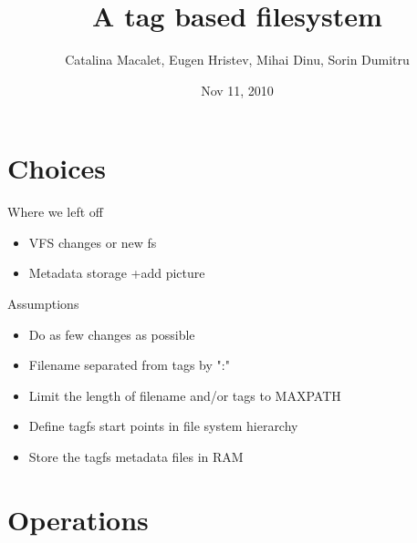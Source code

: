 \documentclass{beamer}
\title[TagFS]{A tag based filesystem}
\author{Catalina Macalet, Eugen Hristev, Mihai Dinu, Sorin Dumitru}
\institute{Politehnic University of Bucharest}
\date{Nov 11, 2010}
\begin{document}
\begin{frame}
  \titlepage
\end{frame}

\section{Choices}

\begin{frame}{Where we left off}
    \begin{itemize}
        \item{VFS changes or new fs}
        \item{Metadata storage}
            +add picture    
    \end{itemize}
\end{frame}

\begin{frame}{Assumptions}
    \begin{itemize}
        \item{Do as few changes as possible}
        \item{Filename separated from tags by ":"}
        \item{Limit the length of filename and/or tags to MAXPATH}
        \item{Define tagfs start points in file system hierarchy}
        \item{Store the tagfs metadata files in RAM}
    \end{itemize}
\end{frame}

\section{Operations}
\end{document}
